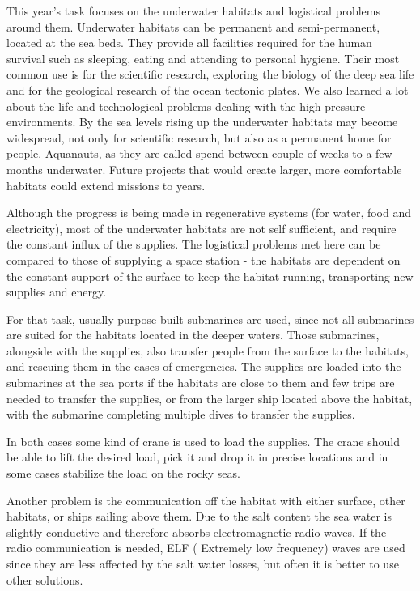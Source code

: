 \documentclass{article}
\begin{document}
	This year's task focuses on the underwater habitats and logistical problems 
	around them.
	Underwater habitats can be permanent and semi-permanent, located at 
	the sea beds.
	They provide all facilities required for the human survival such as 
	sleeping, eating and attending to personal hygiene.
	Their most common use is for the scientific research, exploring the biology 
	of the deep sea life and for the geological research of the ocean tectonic 
	plates.
	We also learned a lot about the life and technological problems dealing 
	with the high pressure environments.
	By the sea levels rising up the underwater habitats may become widespread, 
	not only for scientific research, but also as a permanent home for people.
	Aquanauts, as they are called spend between couple of weeks to a few months 
	underwater.
	Future projects that would create larger, more comfortable habitats could 
	extend missions to years.
	
	Although the progress is being made in regenerative systems (for water, 
	food  and electricity), most of the underwater habitats are not self 
	sufficient, 
	and require the constant influx of the supplies.
	The logistical problems met here can be compared to those of 
	supplying a space station - the habitats are dependent on the constant 
	support of the surface to keep the habitat running, transporting new 
	supplies and energy.
	
	
	For that task, usually purpose built submarines are used,
	since not all submarines are suited for the habitats located in the deeper 
	waters.
	Those submarines, alongside with the supplies, also transfer people from 
	the surface to the habitats, and rescuing them in the 
	cases of emergencies. 
	The supplies are loaded into the submarines at the sea ports if the 
	habitats are close to them and few trips are needed to transfer the 
	supplies, or from the larger ship located above the habitat, with the 
	submarine completing multiple dives to transfer the supplies.
	
	In both cases some kind of crane is used to load the supplies. 
	The crane should be able to lift the desired load, pick it and drop it in 
	precise locations and in some cases stabilize the load on the rocky seas.
	
	Another problem is the communication off the habitat with either surface, 
	other habitats, or ships sailing above them.
	Due to the salt content the sea water is slightly conductive and therefore 
	absorbs electromagnetic radio-waves.
	If the radio communication is needed, ELF ( Extremely low frequency) waves 
	are used since they are less affected by the salt water losses, but often 
	it is better to use other solutions.
	
\end{document}
